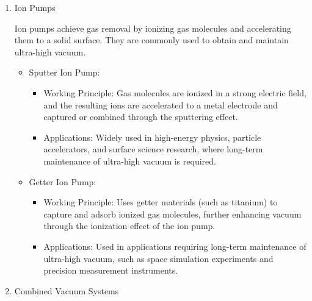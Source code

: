 \begin{enumerate}
\begin{enumerate}
\begin{enumerate}
\begin{itemize}
				\item Activated Charcoal Pump:
				\begin{itemize}
					\item Working Principle: Activated charcoal has a large number of micropores, which can effectively adsorb gas molecules at low temperatures, thereby reducing the pressure.
					\item Applications: Typically used in conjunction with other pumps, especially in the process of achieving ultra-high vacuum.
				\end{itemize}
			\end{itemize}
			
			\item Ion Pumps
			
			Ion pumps achieve gas removal by ionizing gas molecules and accelerating them to a solid surface. They are commonly used to obtain and maintain ultra-high vacuum.
			
			\begin{itemize}
				\item Sputter Ion Pump:
				\begin{itemize}
					\item Working Principle: Gas molecules are ionized in a strong electric field, and the resulting ions are accelerated to a metal electrode and captured or combined through the sputtering effect.
					\item Applications: Widely used in high-energy physics, particle accelerators, and surface science research, where long-term maintenance of ultra-high vacuum is required.
				\end{itemize}
				
				\item Getter Ion Pump:
				\begin{itemize}
					\item Working Principle: Uses getter materials (such as titanium) to capture and adsorb ionized gas molecules, further enhancing vacuum through the ionization effect of the ion pump.
					\item Applications: Used in applications requiring long-term maintenance of ultra-high vacuum, such as space simulation experiments and precision measurement instruments.
				\end{itemize}
			\end{itemize}
			
			\item Combined Vacuum Systems
			

\end{enumerate}
\end{enumerate}
\end{enumerate}
